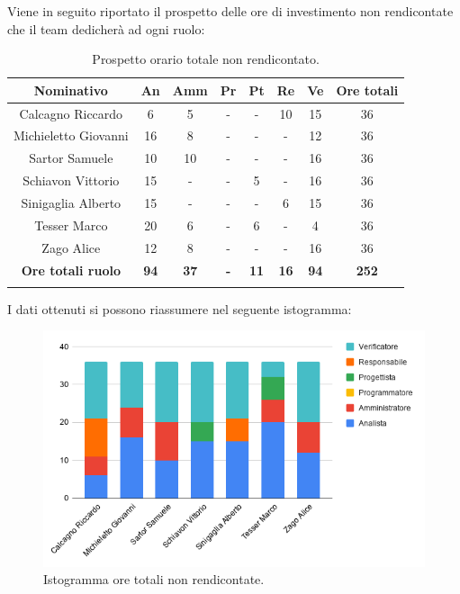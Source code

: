 Viene in seguito riportato il prospetto delle ore di investimento non rendicontate che il team dedicherà ad ogni ruolo:
\begin{longtable}{|c|c|c|c|c|c|c|c|}
	\hline
	\rowcolor[HTML]{F9CB9C} 
	\textbf{Nominativo} & \textbf{An} & \textbf{Amm} & \textbf{Pr} & \textbf{Pt} & \textbf{Re} & \textbf{Ve} & \textbf{Ore totali} \\
	\hline
	Calcagno Riccardo &
	6 &
	5 &
	- &
	- &
	10 &
	15 &
	36 \\
	\hline
	Michieletto Giovanni &
	16 &
	8 &
	- &
	- &
	- &
	12 &
	36 \\
	\hline
	Sartor Samuele &
	10 &
	10 &
	- &
	- &
	- &
	16 &
	36 \\
	\hline
	Schiavon Vittorio & 
	15 &
	- &
	- &
	5 &
	- &
	16 &
	36 \\
	\hline
	Sinigaglia Alberto & 
	15 &
	- &
	- &
	- &
	6 &
	15 &
	36 \\
	\hline
	Tesser Marco &
	20 &
	6 &
	- &
	6 &
	- &
	4 &
	36 \\
	\hline
	Zago Alice &
	12 &
	8 &
	- &
	- &
	- &
	16 &
	36 \\
	\hline	
	\rowcolor[HTML]{F9CB9C} 
	\textbf{Ore totali ruolo} & \textbf{94} & \textbf{37} & \textbf{-} & \textbf{11} & \textbf{16} & \textbf{94} & \textbf{252} \\
	\hline
	\caption{Prospetto orario totale non rendicontato.}
	\label{fig: Prospetto orario totale non rendicontato.}
\end{longtable}

I dati ottenuti si possono riassumere nel seguente istogramma:
\begin{figure}[H]
	\centering
	\includegraphics[width=0.8\linewidth]{./res/images/OreNonRendicontate.png}
	\caption{Istogramma ore totali non rendicontate.}
	\label{fig: Istogramma ore totali non rendicontate.}
\end{figure}

